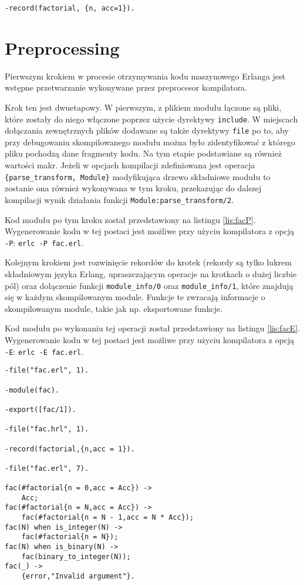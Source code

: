 \begin{lstlisting}[style=erlang, caption=Plik fac.hrl, label=lis:facHRL]
-record(factorial, {n, acc=1}).
\end{lstlisting}

\section{Preprocessing}

Pierwszym krokiem w procesie otrzymywania kodu maszynowego Erlanga jest wstępne przetwarzanie wykonywane przez preprocesor kompilatora.

Krok ten jest dwuetapowy. W pierwszym, z plikiem modułu łączone są pliki, które zostały do niego włączone poprzez użycie dyrektywy \texttt{\-include}. W miejscach dołączania zewnętrznych plików dodawane są także dyrektywy \texttt{\-file} po to, aby przy debugowaniu skompilowanego modułu można było zidentyfikować z którego pliku pochodzą dane fragmenty kodu. Na tym etapie podstawiane są również wartości makr. Jeżeli w opcjach kompilacji zdefiniowana jest operacja \texttt{\{parse\_transform, Module\}} modyfikująca drzewo składniowe modułu to zostanie ona również wykonywana w tym kroku, przekazując do dalszej kompilacji wynik działania funkcji \texttt{Module:parse\_transform/2}.

Kod modułu po tym kroku został przedstawiony na listingu \ref{lis:facP}. Wygenerowanie kodu w tej postaci jest możliwe przy użyciu kompilatora z opcją \texttt{-P}: \texttt{erlc -P fac.erl}.

Kolejnym krokiem jest rozwinięcie rekordów do krotek (rekordy są tylko lukrem składniowym języka Erlang, upraszczającym operacje na krotkach o dużej liczbie pól) oraz dołączenie funkcji \texttt{module\_info/0} oraz \texttt{module\_info/1}, które znajdują się w każdym skompilowanym module.
Funkcje te zwracają informacje o skompilowanym module, takie jak np. eksportowane funkcje.

Kod modułu po wykonaniu tej operacji został przedstawiony na listingu \ref{lis:facE}. Wygenerowanie kodu w tej postaci jest możliwe przy użyciu kompilatora z opcją \texttt{-E}: \texttt{erlc -E fac.erl}.

\begin{lstlisting}[style=erlang, caption=Moduł \texttt{fac} po pierwszym przetworzeniu, label=lis:facP]
-file("fac.erl", 1).

-module(fac).

-export([fac/1]).

-file("fac.hrl", 1).

-record(factorial,{n,acc = 1}).

-file("fac.erl", 7).

fac(#factorial{n = 0,acc = Acc}) ->
    Acc;
fac(#factorial{n = N,acc = Acc}) ->
    fac(#factorial{n = N - 1,acc = N * Acc});
fac(N) when is_integer(N) ->
    fac(#factorial{n = N});
fac(N) when is_binary(N) ->
    fac(binary_to_integer(N));
fac(_) ->
    {error,"Invalid argument"}.
\end{lstlisting}

